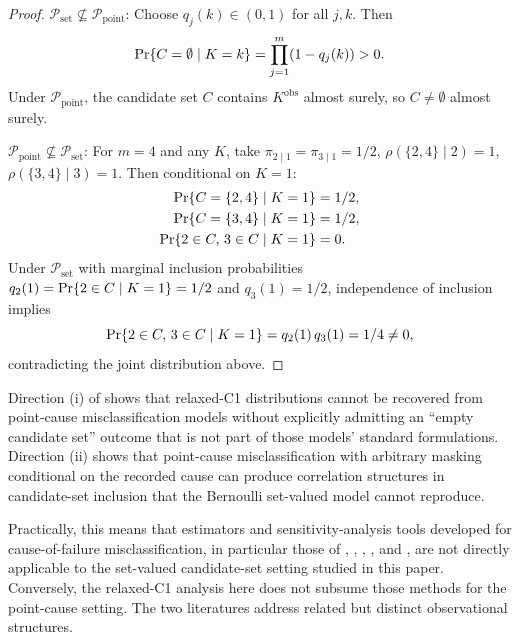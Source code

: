 \begin{proof}
$\mathcal{P}_{\mathrm{set}} \not\subseteq \mathcal{P}_{\mathrm{point}}$:
Choose $q_j(k) \in (0, 1)$ for all $j, k$. Then
\begin{equation*}
    \mathrm{Pr}\{C = \emptyset \mid K = k\} = \prod_{j=1}^{m} (1 - q_j(k)) > 0.
\end{equation*}
Under $\mathcal{P}_{\mathrm{point}}$, the candidate set $C$ contains
$K^{\mathrm{obs}}$ almost surely, so $C \neq \emptyset$ almost surely.

$\mathcal{P}_{\mathrm{point}} \not\subseteq \mathcal{P}_{\mathrm{set}}$: For
$m = 4$ and any $K$, take $\pi_{2 \mid 1} = \pi_{3 \mid 1} = 1/2$,
$\rho(\{2, 4\} \mid 2) = 1$, $\rho(\{3, 4\} \mid 3) = 1$. Then conditional on
$K = 1$:
\begin{align*}
    \mathrm{Pr}\{C = \{2, 4\} \mid K = 1\} &= 1/2, \\
    \mathrm{Pr}\{C = \{3, 4\} \mid K = 1\} &= 1/2, \\
    \mathrm{Pr}\{2 \in C, \, 3 \in C \mid K = 1\} &= 0.
\end{align*}
Under $\mathcal{P}_{\mathrm{set}}$ with marginal inclusion probabilities
$q_2(1) = \mathrm{Pr}\{2 \in C \mid K = 1\} = 1/2$ and $q_3(1) = 1/2$, independence
of inclusion implies
\begin{equation*}
    \mathrm{Pr}\{2 \in C, \, 3 \in C \mid K = 1\}
        = q_2(1)\, q_3(1) = 1/4 \neq 0,
\end{equation*}
contradicting the joint distribution above.
\end{proof}

\begin{remark}
\label{rem:set-vs-point}
Direction (i) of  shows that relaxed-C1 distributions
cannot be recovered from point-cause misclassification models without
explicitly admitting an ``empty candidate set'' outcome that is not part of
those models' standard formulations. Direction (ii) shows that point-cause
misclassification with arbitrary masking conditional on the recorded cause
can produce correlation structures in candidate-set inclusion that the
Bernoulli set-valued model cannot reproduce.

Practically, this means that estimators and sensitivity-analysis tools
developed for cause-of-failure misclassification, in particular those of
\citet{Ebrahimi1996}, \citet{VanRompaye2012}, \citet{HaTsodikov2015},
\citet{MorenoBetancur2015}, and \citet{Bakoyannis2025}, are not directly
applicable to the set-valued candidate-set setting studied in this paper.
Conversely, the relaxed-C1 analysis here does not subsume those methods for
the point-cause setting. The two literatures address related but distinct
observational structures.
\end{remark}

